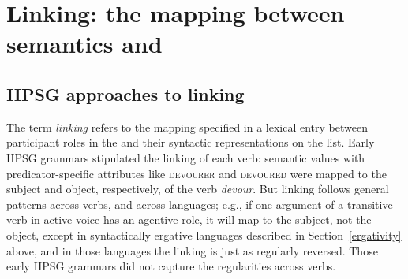 \documentclass[output=paper
 	        ,biblatex
                ,babelshorthands
                ,newtxmath
                ,draftmode
                ,colorlinks, citecolor=brown
]{langscibook}
\begin{document}
\section{Linking: the mapping between semantics and \argst}
\label{linking-sec}\label{arg-st:sec-linking}

\subsection{HPSG approaches to linking}
\label{arg-st:sec-hpsg-approaches-to-linking}

The term \textit{linking} refers to the mapping specified in a lexical entry between participant
roles in the  and their syntactic representations on the \argst
list. Early HPSG grammars stipulated the linking of each verb: semantic \content values with
predicator-specific attributes like \textsc{devourer} and \textsc{devoured} were mapped to the
subject and object, respectively, of the verb \textit{devour}.  But linking follows general patterns
across verbs, and across languages; e.g., if one argument of a transitive verb in active voice has
an agentive role, it will map to the subject, not the object, except in syntactically ergative
languages described in Section~\ref{ergativity} above, and in those languages the linking is just as
regularly reversed.  Those early HPSG grammars did not capture the regularities across verbs.
\end{document}
